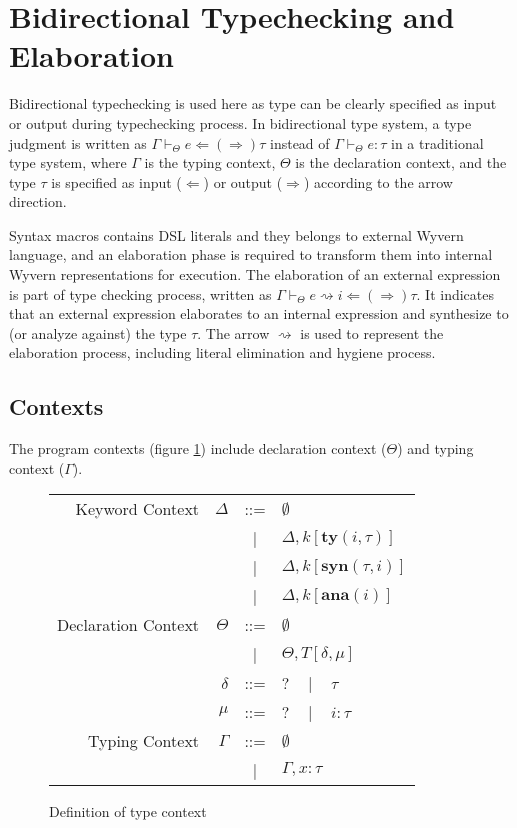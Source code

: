 \documentclass{sig-alternate}
\newcommand{\mycaption}[1]{\vspace{-4px}\caption{#1}\vspace{-2px}}
\begin{document}
\section{Bidirectional Typechecking and Elaboration}
Bidirectional typechecking is used here as type can be clearly specified as input or output during typechecking process. In bidirectional type system, a type judgment is written as $\Gamma\vdash_{\Theta} e\Leftarrow(\Rightarrow)\tau$ instead of $\Gamma\vdash_{\Theta} e:\tau$ in a traditional type system, where $\Gamma$ is the typing context, $\Theta$ is the declaration context, and the type $\tau$ is specified as input ($\Leftarrow$) or output ($\Rightarrow$) according to the arrow direction. 

Syntax macros contains DSL literals and they belongs to external Wyvern language, and an elaboration phase is required to transform them into internal Wyvern representations for execution. The elaboration of an external expression is part of type checking process, written as $\Gamma\vdash_{\Theta} e\rightsquigarrow i \Leftarrow(\Rightarrow) \tau$. It indicates that an external expression elaborates to an internal expression and synthesize to (or analyze against) the type $\tau$. The arrow $\rightsquigarrow$ is used to represent the elaboration process, including literal elimination and hygiene process.

\subsection{Contexts}
The program contexts (figure \ref{typechecking-environment}) include declaration context ($\Theta$) and typing context ($\Gamma$). 

\begin{figure}[ht]
\begin{center}
\begin{tabular}{r r c l}
Keyword Context       & $\Delta$  & ::=   & $\emptyset$\\
                      &           &   |   & $\Delta,k[\mathbf{ty}(i,\tau)]$\\
                      &           &   |   & $\Delta,k[\mathbf{syn}(\tau,i)]$\\
                      &           &   |   & $\Delta,k[\mathbf{ana}(i)]$\\
Declaration Context   & $\Theta$  & ::=   & $\emptyset$\\
                      &           &   |   & $\Theta,T[\delta,\mu]$\\
                      & $\delta$  &  ::=  & $?$ ~ | ~ $\tau$\\
                      & $\mu$     &  ::=  & $?$ ~ | ~ $i:\tau$\\
Typing Context        & $\Gamma$  &  ::=  & $\emptyset$\\
                      &           &   |   & $\Gamma,x:\tau$
\end{tabular}
\end{center}
\mycaption{Definition of type context}
\label{typechecking-environment}
\end{figure}
\end{document}
